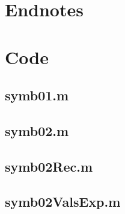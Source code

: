 \documentclass{beamer}
\begin{document}
   \begin{frame}
 
 
     
   \end{frame}


     \section{Endnotes}
{\tiny
     \theendnotes
}





\section{Code}
\begin{frame}
\label{sec:code}
\end{frame}
\subsection{symb01.m}

\begin{frame}
\label{sec:symb01.m}
\end{frame}



\newpage
\subsection{symb02.m}

\begin{frame}
\label{sec:symb02.m}  
\end{frame}


\newpage
\subsection{symb02Rec.m}
\begin{frame}
\label{sec:symb02Rec.m}  
\end{frame}



\newpage
\subsection{symb02ValsExp.m}
\begin{frame}
\label{sec:symb02ValsExp.m}
\end{frame}
\end{document}
